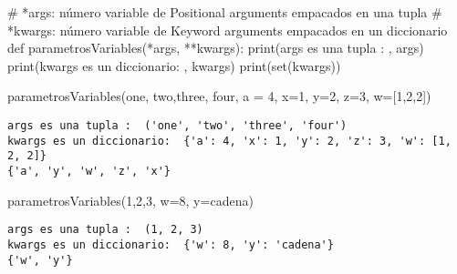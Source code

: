\documentclass[
  letterpaper,
  DIV=11,
  numbers=noendperiod]{scrreprt}
\newenvironment{Shaded}{\begin{snugshade}}{\end{snugshade}}
\newcommand{\BuiltInTok}[1]{\textcolor[rgb]{0.00,0.23,0.31}{#1}}
\newcommand{\CommentTok}[1]{\textcolor[rgb]{0.37,0.37,0.37}{#1}}
\newcommand{\DecValTok}[1]{\textcolor[rgb]{0.68,0.00,0.00}{#1}}
\newcommand{\KeywordTok}[1]{\textcolor[rgb]{0.00,0.23,0.31}{#1}}
\newcommand{\NormalTok}[1]{\textcolor[rgb]{0.00,0.23,0.31}{#1}}
\newcommand{\OperatorTok}[1]{\textcolor[rgb]{0.37,0.37,0.37}{#1}}
\newcommand{\StringTok}[1]{\textcolor[rgb]{0.13,0.47,0.30}{#1}}
\begin{document}
\begin{Shaded}
\begin{Highlighting}[]
\CommentTok{\# *args: número variable de Positional arguments empacados en una tupla}
\CommentTok{\# *kwargs: número variable de Keyword arguments empacados en un diccionario}
\KeywordTok{def}\NormalTok{ parametrosVariables(}\OperatorTok{*}\NormalTok{args, }\OperatorTok{**}\NormalTok{kwargs):}
    \BuiltInTok{print}\NormalTok{(}\StringTok{\textquotesingle{}args es una tupla : \textquotesingle{}}\NormalTok{, args)}
    \BuiltInTok{print}\NormalTok{(}\StringTok{\textquotesingle{}kwargs es un diccionario: \textquotesingle{}}\NormalTok{, kwargs)}
    \BuiltInTok{print}\NormalTok{(}\BuiltInTok{set}\NormalTok{(kwargs))}
\end{Highlighting}
\end{Shaded}

\begin{Shaded}
\begin{Highlighting}[]
\NormalTok{parametrosVariables(}\StringTok{\textquotesingle{}one\textquotesingle{}}\NormalTok{, }\StringTok{\textquotesingle{}two\textquotesingle{}}\NormalTok{,}\StringTok{\textquotesingle{}three\textquotesingle{}}\NormalTok{, }\StringTok{\textquotesingle{}four\textquotesingle{}}\NormalTok{, a }\OperatorTok{=} \DecValTok{4}\NormalTok{,  x}\OperatorTok{=}\DecValTok{1}\NormalTok{, y}\OperatorTok{=}\DecValTok{2}\NormalTok{, z}\OperatorTok{=}\DecValTok{3}\NormalTok{, w}\OperatorTok{=}\NormalTok{[}\DecValTok{1}\NormalTok{,}\DecValTok{2}\NormalTok{,}\DecValTok{2}\NormalTok{])}
\end{Highlighting}
\end{Shaded}

\begin{verbatim}
args es una tupla :  ('one', 'two', 'three', 'four')
kwargs es un diccionario:  {'a': 4, 'x': 1, 'y': 2, 'z': 3, 'w': [1, 2, 2]}
{'a', 'y', 'w', 'z', 'x'}
\end{verbatim}

\begin{Shaded}
\begin{Highlighting}[]
\NormalTok{parametrosVariables(}\DecValTok{1}\NormalTok{,}\DecValTok{2}\NormalTok{,}\DecValTok{3}\NormalTok{, w}\OperatorTok{=}\DecValTok{8}\NormalTok{, y}\OperatorTok{=}\StringTok{\textquotesingle{}cadena\textquotesingle{}}\NormalTok{)}
\end{Highlighting}
\end{Shaded}

\begin{verbatim}
args es una tupla :  (1, 2, 3)
kwargs es un diccionario:  {'w': 8, 'y': 'cadena'}
{'w', 'y'}
\end{verbatim}
\end{document}
